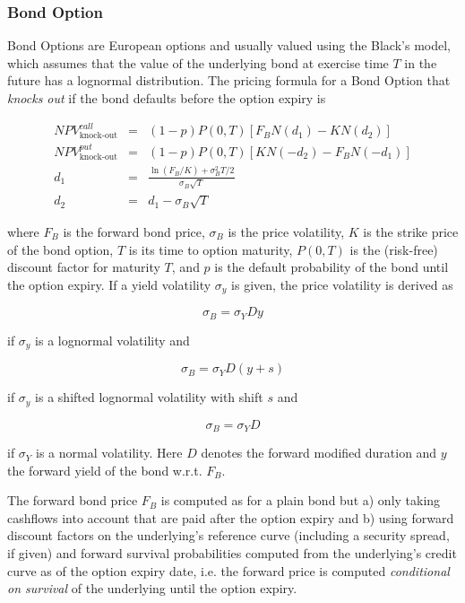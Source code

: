 \subsubsection{Bond Option}
\label{pricing:ir_bondoption}

Bond Options are European options and usually valued using the Black's model, which assumes that the value of the
underlying bond at exercise time $T$ in the future has a lognormal distribution. The pricing formula for a Bond Option
that {\em knocks out} if the bond defaults before the option expiry is

\begin{eqnarray*}
NPV^{call}_{\text{knock-out}}&=& (1-p) P(0,T)\left[F_BN(d_1)-KN(d_2)\right] \\
NPV^{put}_{\text{knock-out}}&=& (1-p) P(0,T)\left[KN(-d_2)-F_BN(-d_1)\right] \\
d_1&=&\frac{\ln(F_B/K)+\sigma_B^2T/2}{\sigma_B\sqrt{T}}\\ 
d_2&=&d_1-\sigma_B\sqrt{T} 
\end{eqnarray*}

where $F_B$ is the forward bond price, $\sigma_B$ is the price volatility, $K$ is the strike price of the bond option,
$T$ is its time to option maturity, $P(0,T)$ is the (risk-free) discount factor for maturity $T$, and $p$ is the default
probability of the bond until the option expiry. If a yield volatility $\sigma_y$ is given, the price volatility is
derived as

\begin{equation}
\sigma_B = \sigma_Y  D y
\end{equation}

if $\sigma_y$ is a lognormal volatility and

\begin{equation}
\sigma_B = \sigma_Y  D  (y + s)
\end{equation}

if $\sigma_y$ is a shifted lognormal volatility with shift $s$ and

\begin{equation}
\sigma_B = \sigma_Y  D
\end{equation}

if $\sigma_Y$ is a normal volatility. Here $D$ denotes the forward modified duration and $y$ the forward yield of the
bond w.r.t. $F_B$.

The forward bond price $F_B$ is computed as for a plain bond but a) only taking cashflows into account that are paid
after the option expiry and b) using forward discount factors on the underlying's reference curve (including a security
spread, if given) and forward survival probabilities computed from the underlying's credit curve as of the option expiry
date, i.e. the forward price is computed {\em conditional on survival} of the underlying until the option expiry.

